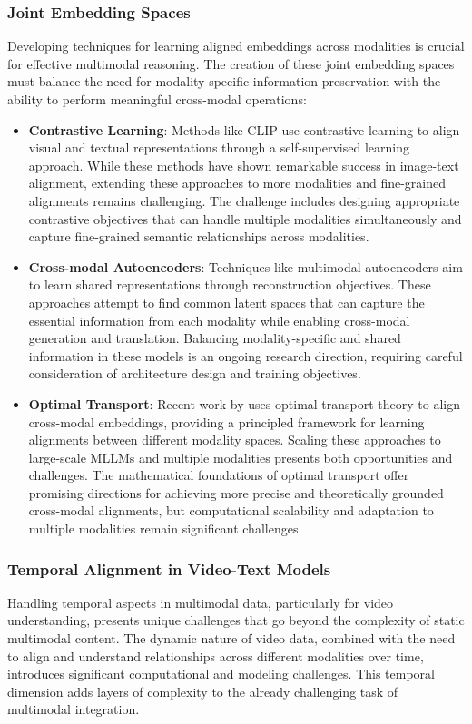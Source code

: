 \subsubsection{Joint Embedding Spaces}
Developing techniques for learning aligned embeddings across modalities is crucial for effective multimodal reasoning. The creation of these joint embedding spaces must balance the need for modality-specific information preservation with the ability to perform meaningful cross-modal operations:

\begin{itemize}
    \item \textbf{Contrastive Learning}: Methods like CLIP \citep{radford2021learning} use contrastive learning to align visual and textual representations through a self-supervised learning approach. While these methods have shown remarkable success in image-text alignment, extending these approaches to more modalities and fine-grained alignments remains challenging. The challenge includes designing appropriate contrastive objectives that can handle multiple modalities simultaneously and capture fine-grained semantic relationships across modalities.
    
    \item \textbf{Cross-modal Autoencoders}: Techniques like multimodal autoencoders \citep{ngiam2011multimodal} aim to learn shared representations through reconstruction objectives. These approaches attempt to find common latent spaces that can capture the essential information from each modality while enabling cross-modal generation and translation. Balancing modality-specific and shared information in these models is an ongoing research direction, requiring careful consideration of architecture design and training objectives.
    
    \item \textbf{Optimal Transport}: Recent work by \citet{chen2020optimal} uses optimal transport theory to align cross-modal embeddings, providing a principled framework for learning alignments between different modality spaces. Scaling these approaches to large-scale MLLMs and multiple modalities presents both opportunities and challenges. The mathematical foundations of optimal transport offer promising directions for achieving more precise and theoretically grounded cross-modal alignments, but computational scalability and adaptation to multiple modalities remain significant challenges.
\end{itemize}

\subsubsection{Temporal Alignment in Video-Text Models}
Handling temporal aspects in multimodal data, particularly for video understanding, presents unique challenges that go beyond the complexity of static multimodal content. The dynamic nature of video data, combined with the need to align and understand relationships across different modalities over time, introduces significant computational and modeling challenges. This temporal dimension adds layers of complexity to the already challenging task of multimodal integration.

